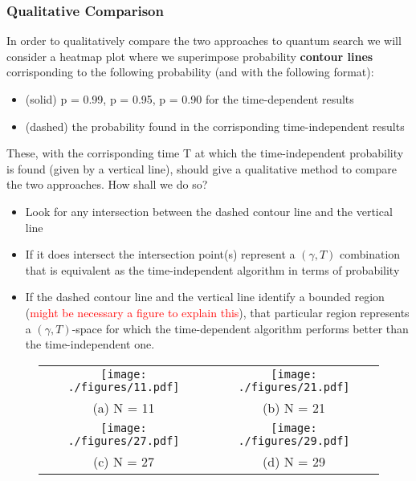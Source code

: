 \documentclass[aps,pra,reprint, onecolumn]{revtex4-2}
\newcommand{\red}[1]{\textcolor{red}{#1}}
\begin{document}
\subsubsection{\textbf{Qualitative Comparison}}
In order to qualitatively compare the two approaches to quantum search we will consider a heatmap plot where we superimpose probability \textbf{contour lines} corrisponding to the following probability (and with the following format):
\begin{itemize}
  \item (solid) p = 0.99, p = 0.95, p = 0.90 for the time-dependent results
  \item (dashed) the probability found in the corrisponding time-independent results
\end{itemize}
These, with the corrisponding time T at which the time-independent probability is found (given by a vertical line), should give a qualitative method to compare the two approaches. How shall we do so?
\begin{itemize}
	\item Look for any intersection between the dashed contour line and the vertical line
	\item If it does intersect the intersection point(s) represent a $(\gamma, T)$ combination that is equivalent as the time-independent algorithm in terms of probability
	\item If the dashed contour line and the vertical line identify a bounded region (\red{might be necessary a figure to explain this}), that particular region represents a $(\gamma, T)$-space for which the time-dependent algorithm performs better than the time-independent one.
\end{itemize}


\begin{figure}[ht]
\begin{tabular}{cc}
  \texttt{[image: ./figures/11.pdf]} &   \texttt{[image: ./figures/21.pdf]} \\
(a) N = 11 & (b) N = 21\\[6pt]
\texttt{[image: ./figures/27.pdf]} &   \texttt{[image: ./figures/29.pdf]} \\
(c) N = 27 & (d) N = 29\\[6pt]
\end{tabular}
\end{figure}

\end{document}
